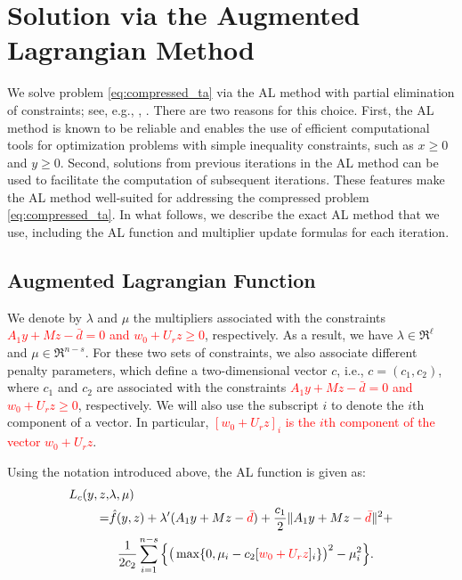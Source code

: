 \documentclass[11pt]{article}
\begin{document}
\section{Solution via the Augmented Lagrangian Method}
\label{sec:alm}
We solve problem \eqref{eq:compressed_ta} via the AL method with partial elimination of constraints; see, e.g., \cite[Section 2.4]{Ber82a}, \cite[Section~5.2]{bertsekas2016nonlinear}. There are two reasons for this choice. First, the AL method is known to be reliable and enables the use of efficient computational tools for optimization problems with simple inequality constraints, such as $x\ge0$ and $y\ge0$. Second, solutions from previous iterations in the AL method can be used to facilitate the computation of subsequent iterations. These features make the AL method well-suited for addressing the compressed problem \eqref{eq:compressed_ta}. In what follows, we describe the exact AL method that we use, including the AL function and multiplier update formulas for each iteration.

\subsection{Augmented Lagrangian Function}
We denote by $\lambda$ and $\mu$ the multipliers associated with the constraints \textcolor{red}{$A_1 y + M z - \bar d = 0$ and $w_0+U_r z \geq 0$}, respectively. As a result, we have $\lambda\in \Re^\ell$ and $\mu\in \Re^{n-s}$. For these two sets of constraints, we also associate different penalty parameters, which define a two-dimensional vector $c$, i.e., $c = (c_1, c_2)$, where $c_1$ and $c_2$ are associated with the constraints \textcolor{red}{$A_1 y + M z - \bar d = 0$ and $w_0+U_r z \geq 0$}, respectively. We will also use the subscript $i$ to denote the $i$th component of a vector. In particular, \textcolor{red}{$[w_0+U_r z]_i$ is the $i$th component of the vector $w_0+U_r z$}. 

Using the notation introduced above, the AL function is given as:
\begin{equation}
    \label{eq:aug_lag_form_2}
    \begin{aligned}
            {L}_c(y,z,&\lambda,\mu)\\
    =&\hat f(y,z)+\lambda'(A_1y+Mz-\textcolor{red}{\bar d})+\frac{c_1}{2}\Vert A_1y+Mz-\textcolor{red}{\bar d}\Vert^2+\\
    &\ \ \frac{1}{2c_2}\sum_{i=1}^{n-s}\Big\{\big(\max\{0,\mu_i-c_2[\textcolor{red}{w_0+U_rz}]_i\}\big)^2-\mu_i^2\Big\}.
    \end{aligned}
\end{equation}
\end{document}
